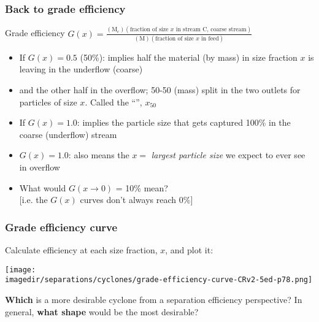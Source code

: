\begin{frame}\frametitle{Back to grade efficiency}
	\begin{exampleblock}{Grade efficiency}
		$G(x) = \displaystyle \frac{(\text{M}_\text{c})(\text{fraction of size $x$ in stream C, coarse stream})}{(\text{M})(\text{fraction of size $x$ in feed})}$
	\end{exampleblock}
	\begin{itemize}
		\item	If $G(x) = 0.5$ (50\%): implies half the material (by mass) in size fraction $x$ is leaving in the underflow (coarse)
		\item	and the other half in the overflow; 50-50 (mass) split in the two outlets for particles of size $x$. Called the ``{\color{purple}{cut size}}'', $x_{50}$
		\item	If $G(x) = 1.0$: implies the particle size that gets captured 100\%  in the coarse (underflow) stream
		\item	$G(x) = 1.0$: also means the $x=$ \emph{largest particle size} we expect to ever see in overflow
		\item	\adv What would $G(x \rightarrow 0)$ = 10\% mean? \\{\scriptsize [i.e. the $G(x)$ curves don't always reach 0\%]}
	\end{itemize}
\end{frame}

\begin{frame}\frametitle{Grade efficiency curve}
	Calculate efficiency at each size fraction, $x$, and plot it:
	\begin{center}
		\texttt{[image: \\imagedir/separations/cyclones/grade-efficiency-curve-CRv2-5ed-p78.png]}
	\end{center}
	{\color{myOrange}\textbf{Which} is a more desirable cyclone} from a separation efficiency perspective? In general, {\color{myOrange}\textbf{what shape}} would be the most desirable?
\end{frame}

